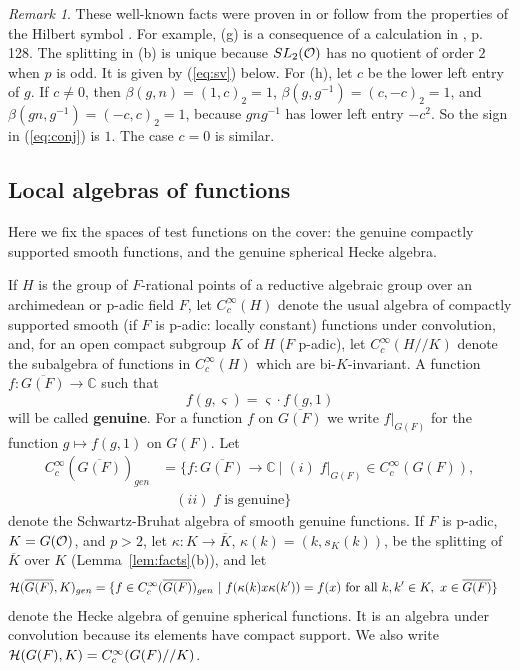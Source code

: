 \documentclass[12pt,letterpaper,openany]{book}
\theoremstyle{plain}
\theoremstyle{definition}
\theoremstyle{remark}
\newtheorem{remark}[theorem]{Remark}
\theoremstyle{remark}
\begin{document}
\begin{remark}
These well-known facts
were proven in \cite{K2} or follow from the properties of the Hilbert
symbol \cite{W1}.
For example, (g) is a consequence of a calculation in \cite{Fl}, p. 128.
The splitting in (b) is unique because $SL_2({\cal O})$ has no quotient of
order $2$ when $p$ is odd. It is given by (\ref{eq:sv}) below.
For (h), let $c$ be the lower left entry of $g$. If $c\neq0$, then
$\beta(g,n)=(1,c)_2=1$, $\beta(g,g^{-1})=(c,-c)_2=1$, and
$\beta(gn,g^{-1})=(-c,c)_2=1$, because $gng^{-1}$ has lower left entry
$-c^2$. So the sign in (\ref{eq:conj}) is $1$. The case $c=0$ is similar.
\end{remark}

\subsection{Local algebras of functions}\label{sec:localalg}

Here we fix the spaces of test functions on the cover: the genuine compactly supported smooth functions, and the genuine spherical Hecke algebra.


If $H$ is the group of $F$-rational points of a reductive algebraic group
over an archimedean
or p-adic field $F$, let $C_c^\infty (H)$ denote the usual
algebra of compactly supported smooth (if $F$ is p-adic: locally constant)
functions under convolution, and, for an open compact subgroup $K$ of
$H$ ($F$ p-adic), let $C_c^\infty (H//K)$ denote the subalgebra of
functions in $C_c^\infty(H)$ which are bi-$K$-invariant. A
function $f:\overline{G(F)}\rightarrow {\mathbb{C}}$ such that
\begin{equation}
f(g,\varsigma )=\varsigma \cdot f(g,1)\label{eq:genuine}
\end{equation}
will be called \textbf{genuine}. For a function $f$ on
$\overline{G(F)}$ we write $f|_{G(F)}$ for the function $g\mapsto f(g,1)$
on $G(F)$. Let
\begin{align*}
C_c^\infty (\overline{G(F)})_{gen}
&=\{f:\overline{G(F)}\rightarrow {\mathbb{C}}\
|\;(i)\;f|_{G(F)}\in C_c^\infty (G(F)),
\\
&\quad (ii)\;f\;\mathrm{is\;genuine}\}
\end{align*}
denote the Schwartz-Bruhat algebra of smooth genuine functions.
If $F$ is p-adic, $K=G({\cal O})$, and $p>2$, let
$\kappa:K\rightarrow\overline{K}$, $\kappa(k)=(k,s_K(k))$, be the splitting
of $\overline{K}$ over $K$ (Lemma~\ref{lem:facts}(b)), and let
\begin{align*}
{\cal{H}}(\overline{G(F)},K)_{gen}
&=\{f\in C_c^\infty (\overline{G(F)})_{gen}
\ |\ f(\kappa(k)x\kappa(k'))=f(x)\ \text{for all } k,k'\in K,\
x\in\overline{G(F)}\}
\end{align*}
denote the Hecke algebra of genuine spherical functions. It is an
algebra under convolution because its elements have compact support.
We also write ${\cal H}(G(F),K)=C_c^\infty(G(F)//K)$.
\end{document}
